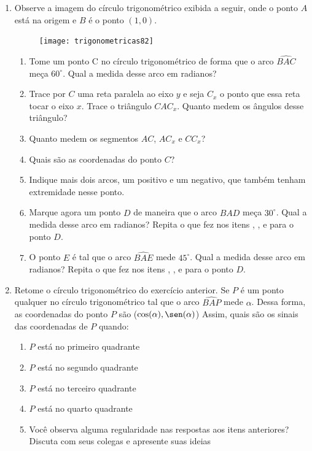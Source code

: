 \begin{enumerate}
\item Observe a imagem do círculo trigonométrico exibida a seguir, onde o ponto $A$ está na origem e $B$ é o ponto $(1,0)$.

\begin{figure}[H]
\centering

\texttt{[image: trigonometricas82]}
\end{figure}

\clearpage
\begin{enumerate}
\item 	Tome um ponto C no círculo trigonométrico de forma que o arco $\widehat{BAC}$ meça $60^{\circ}$. Qual a medida desse arco em radianos?
\item Trace por $C$ uma reta paralela ao eixo $y$ e seja $C_x$ o ponto que essa reta tocar o eixo $x$. Trace o triângulo $CAC_x$. Quanto medem os ângulos desse triângulo?
\item Quanto medem os segmentos $AC$, $AC_x$ e $CC_x$?
\item Quais são as coordenadas do ponto $C$?
\item Indique mais dois arcos, um positivo e um negativo, que também tenham extremidade nesse ponto.
\item Marque agora um ponto $D$ de maneira que o arco $\widehat{BAD}$ meça $30^{\circ}$. Qual a medida desse arco em radianos? Repita o que fez nos itens , ,  e  para o ponto $D$.
\item O ponto $E$ é tal que o arco $\widehat{BAE}$ mede $45^{\circ}$. Qual a medida desse arco em radianos? Repita o que fez nos itens , ,  e  para o ponto $D$.
\end{enumerate}

\item Retome o círculo trigonométrico do exercício anterior. Se $P$ é um ponto qualquer no círculo trigonométrico tal que o arco $\widehat{BAP}$ mede $\alpha$. Dessa forma, as coordenadas do ponto $P$ são ($\cos(\alpha), \sen(\alpha)$) Assim, quais são os sinais das coordenadas de $P$ quando:
\begin{enumerate}
\item $P$ está no primeiro quadrante
\item $P$ está no segundo quadrante
\item $P$ está no terceiro quadrante
\item $P$ está no quarto quadrante
\item Você observa alguma regularidade nas respostas aos itens anteriores? Discuta com seus colegas e apresente suas ideias
\end{enumerate}


\end{enumerate}
